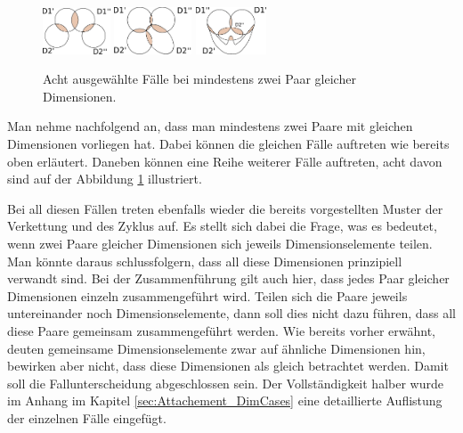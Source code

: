 \documentclass[11pt]{article}
\begin{document}
\begin{figure}[!htb]
%
    \centering
    \includegraphics[width=2cm]{CaseDifferentiation/CaseDifferentiation_2SameDim_4DimSomeDePairPartnered_4Chaining.pdf}
  \label{}
\endminipage
{}%
    \centering
    \includegraphics[width=2.3cm]{CaseDifferentiation/CaseDifferentiation_2SameDim_Cross_1DimSomeDePairPartnered_Circle.pdf}
  \label{}
\endminipage\hfill
{}%
    \centering
    \includegraphics[width=2.1cm]{CaseDifferentiation/CaseDifferentiation_2SameDim_Cross_1DimSomeDePairPartnered_Cross_1DimSomeDePairPartnered_2DiffDSDimShareSameDe_2SameDSShareSameDe.pdf}
  \label{}
\endminipage
\caption{Acht ausgewählte Fälle bei mindestens zwei Paar gleicher Dimensionen.}
\label{fig:SelectCases_MoreAs1DimEqual}
\end{figure}

\noindent
Man nehme nachfolgend an, dass man mindestens zwei Paare mit gleichen Dimensionen vorliegen hat. Dabei können die gleichen Fälle auftreten wie bereits oben erläutert. Daneben können eine Reihe weiterer Fälle auftreten, acht davon sind auf der Abbildung \ref{fig:SelectCases_MoreAs1DimEqual} illustriert.

Bei all diesen Fällen treten ebenfalls wieder die bereits vorgestellten Muster der Verkettung und des Zyklus auf. Es stellt sich dabei die Frage, was es bedeutet, wenn zwei Paare gleicher Dimensionen sich jeweils Dimensionselemente teilen. Man könnte daraus schlussfolgern, dass all diese Dimensionen prinzipiell verwandt sind. Bei der Zusammenführung gilt auch hier, dass jedes Paar gleicher Dimensionen einzeln zusammengeführt wird. Teilen sich die Paare jeweils untereinander noch Dimensionselemente, dann soll dies nicht dazu führen, dass all diese Paare gemeinsam zusammengeführt werden. Wie bereits vorher erwähnt, deuten gemeinsame Dimensionselemente zwar auf ähnliche Dimensionen hin, bewirken aber nicht, dass diese Dimensionen als gleich betrachtet werden. Damit soll die Fallunterscheidung abgeschlossen sein. Der Vollständigkeit halber wurde im Anhang im Kapitel \ref{sec:Attachement_DimCases} eine detaillierte Auflistung der einzelnen Fälle eingefügt.
\end{document}
